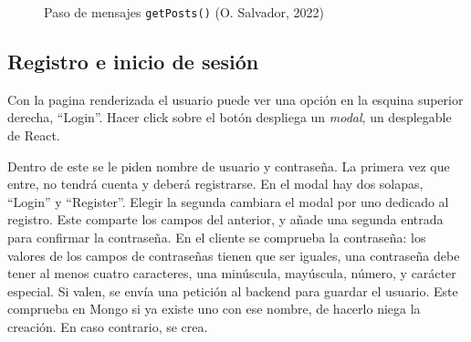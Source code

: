 \documentclass[11pt]{article}
\begin{document}
\begin{flushleft}
	
		\begin{figure}[htb]
			\centering
			\caption{Paso de mensajes \texttt{getPosts()} (O. Salvador, 2022)}
		\end{figure}
	
	\bigskip
	\bigskip
		
	\subsection{Registro e inicio de sesión}
	Con la pagina renderizada el usuario puede ver una opción en la esquina superior derecha, ``Login''. Hacer click sobre el botón despliega un \textit{modal}, un desplegable de React. 
	\linebreak
	
	Dentro de este se le piden nombre de usuario y contraseña. La primera vez que entre, no tendrá cuenta y deberá registrarse. En el modal hay dos solapas, ``Login'' y ``Register''. Elegir la segunda cambiara el modal por uno dedicado al registro. Este comparte los campos del anterior, y añade una segunda entrada para confirmar la contraseña. En el cliente se comprueba la contraseña: los valores de los campos de contraseñas tienen que ser iguales, una contraseña debe tener al menos cuatro caracteres, una  minúscula, mayúscula, número, y carácter especial. Si valen, se envía una petición al backend para guardar el usuario. Este comprueba en Mongo si ya existe uno con ese nombre, de hacerlo niega la creación. En caso contrario, se crea.
	\linebreak
	

\end{flushleft}
\end{document}
